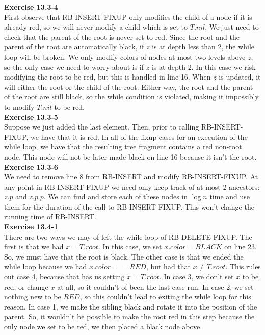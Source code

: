 \documentclass{article}
\begin{document}
\noindent\textbf{Exercise 13.3-4}\\

First observe that RB-INSERT-FIXUP only modifies the child of a node if it is already red, so we will never modify a child which is set to $T.nil$.  We just need to check that the parent of the root is never set to red. Since the root and the parent of the root are automatically black, if $z$ is at depth less than 2, the while loop will be broken.  We only modify colors of nodes at most two levels above $z$, so the only case we need to worry about is if $z$ is at depth 2.  In this case we risk modifying the root to be red, but this is handled in line 16.  When $z$ is updated, it will either the root or the child of the root. Either way, the root and the parent of the root are still black, so the while condition is violated, making it impossibly to modify $T.nil$ to be red. \\

\noindent\textbf{ Exercise 13.3-5} \\

Suppose we just added the last element. Then, prior to calling RB-INSERT-FIXUP, we have that it is red. In all of the fixup cases for an execution of the while loop, we have that the resulting tree fragment contains a red non-root node. This node will not be later made black on line 16 because it isn't the root. \\

\noindent\textbf{Exercise 13.3-6}\\

We need to remove line 8 from RB-INSERT and modify RB-INSERT-FIXUP.  At any point in RB-INSERT-FIXUP we need only keep track of at most 2 ancestors: $z.p$ and $z.p.p$.  We can find and store each of these nodes in $\log n$ time and use them for the duration of the call to RB-INSERT-FIXUP.  This won't change the running time of RB-INSERT.\\

\noindent\textbf{ Exercise 13.4-1} \\

There are two ways we may of left the while loop of RB-DELETE-FIXUP. The first is that we had $x = T.root$. In this case, we set $x.color = BLACK$ on line 23. So, we must have that the root is black. The other case is that we ended the while loop because we had $x.color == RED$, but had that $x\neq T.root$. This rules out case 4, because that has us setting $x=T.root$. In case 3, we don't set $x$ to be red, or change $x$ at all, so it couldn't of been the last case run. In case 2, we set nothing new to be $RED$, so this couldn't lead to exiting the while loop for this reason. In case 1, we make the sibling black and rotate it into the position of the parent. So, it wouldn't be possible to make the root red in this step because the only node we set to be red, we then placed a black node above. 
\end{document}
